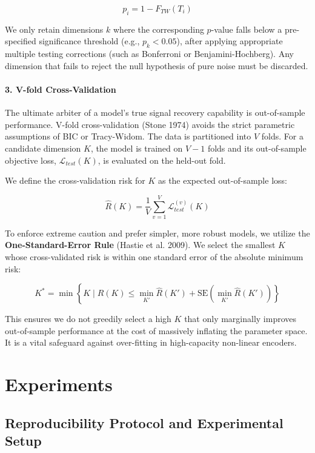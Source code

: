 \documentclass[
  letterpaper,
]{report}
\begin{document}
\[
p_i = 1 - F_{TW}(T_i)
\]

We only retain dimensions \(k\) where the corresponding \(p\)-value
falls below a pre-specified significance threshold (e.g.,
\(p_k < 0.05\)), after applying appropriate multiple testing corrections
(such as Bonferroni or Benjamini-Hochberg). Any dimension that fails to
reject the null hypothesis of pure noise must be discarded.

\subsubsection{3. V-fold
Cross-Validation}\label{v-fold-cross-validation}

The ultimate arbiter of a model's true signal recovery capability is
out-of-sample performance. V-fold cross-validation (Stone 1974) avoids
the strict parametric assumptions of BIC or Tracy-Widom. The data is
partitioned into \(V\) folds. For a candidate dimension \(K\), the model
is trained on \(V-1\) folds and its out-of-sample objective loss,
\(\mathcal{L}_{test}(K)\), is evaluated on the held-out fold.

We define the cross-validation risk for \(K\) as the expected
out-of-sample loss:

\[
\hat{R}(K) = \frac{1}{V} \sum_{v=1}^V \mathcal{L}_{test}^{(v)}(K)
\]

To enforce extreme caution and prefer simpler, more robust models, we
utilize the \textbf{One-Standard-Error Rule} (Hastie et al. 2009). We
select the smallest \(K\) whose cross-validated risk is within one
standard error of the absolute minimum risk:

\[
K^* = \min \left\{ K \mid \hat{R}(K) \leq \min_{K'} \hat{R}(K') + \text{SE}\left(\min_{K'} \hat{R}(K')\right) \right\}
\]

This ensures we do not greedily select a high \(K\) that only marginally
improves out-of-sample performance at the cost of massively inflating
the parameter space. It is a vital safeguard against over-fitting in
high-capacity non-linear encoders.


\chapter{Experiments}\label{experiments}

\section{Reproducibility Protocol and Experimental
Setup}\label{reproducibility-protocol-and-experimental-setup}
\end{document}
